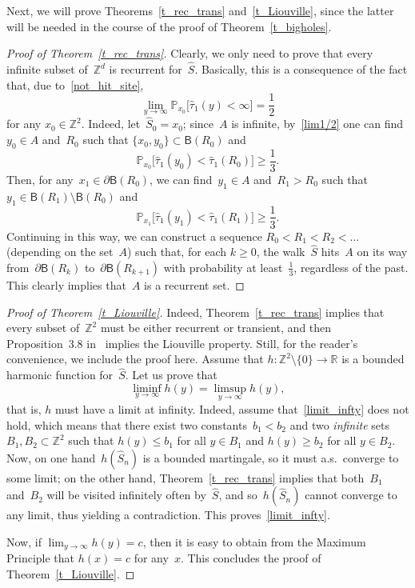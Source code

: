 \documentclass[10pt]{amsart}
\theoremstyle{definition}\newtheorem{defi}[theo]{Definition}\newtheorem{rema}[theo]{Remark}\newtheorem{exam}[theo]{Example}\newtheorem{exem}[theo]{Example}\newtheorem{nota}[theo]{Notation}
\newcommand{\1}[1]{{\mathbf 1}{\{#1\}}}
\newcommand{\Z}{\mathbb{Z}}
\newcommand{\R}{{\mathbb R}}
\newcommand{\s}{{\widehat S}}
\newcommand{\8}{{\infty}}
\newcommand{\IP}{{\mathbb P}}
\newcommand{\htau}{\widehat{\tau}}
\newcommand{\B}{{\mathsf B}}
\begin{document}
Next, we will prove Theorems~\ref{t_rec_trans} and~\ref{t_Liouville}, since the latter will be needed in the course of the proof of Theorem~\ref{t_bigholes}.

\begin{proof}[Proof of Theorem~\ref{t_rec_trans}]
Clearly, we only need to prove that every infinite subset of~$\Z^d$ is recurrent for~$\s$. Basically, this is a consequence of the fact that, due to~\eqref{not_hit_site},
\begin{equation}\label{lim1/2}
\lim_{y\to\infty} \IP_{x_0}\big[\htau_1(y)<\infty\big] = \frac{1}{2}
\end{equation}
for any $x_0\in\Z^2$. Indeed, let~$\s_0=x_0$; since~$A$ is infinite, by~\eqref{lim1/2} one can find~$y_0\in A$ and~$R_0$ such that $\{x_0,y_0\}\subset \B(R_0)$ and
\[
\IP_{x_0}\big[\htau_1(y_0)<\htau_1(R_0)\big] \geq \frac{1}{3}.
\]
Then, for any~$x_1\in \partial\B(R_0)$, we can find~$y_1\in A$ and~$R_1>R_0$ such that $y_1\in \B(R_1)\setminus \B(R_0)$ and
\[
\IP_{x_1}\big[\htau_1(y_1)<\htau_1(R_1)\big] \geq \frac{1}{3}.
\]
Continuing in this way, we can construct a sequence $R_0<R_1<R_2<\ldots$ (depending on the set~$A$) such that, for each $k\geq 0$, the walk~$\s$ hits~$A$ on its way from~$\partial\B(R_k)$ to~$\partial\B(R_{k+1})$ with probability at least~$\frac{1}{3}$, regardless of the past. This clearly implies that~$A$ is a recurrent set.
\end{proof}

\begin{proof}[Proof of Theorem~\ref{t_Liouville}]
Indeed, Theorem~\ref{t_rec_trans} implies that every subset of~$\Z^2$ must be either recurrent or transient, and then Proposition~3.8 in~\cite[Chapter~2]{R84} implies the Liouville property. Still, for the reader's convenience, we include the proof here. Assume that $h:\Z^2\setminus\{0\} \to \R$ is a bounded harmonic function for~$\s$. Let us prove that
\begin{equation}\label{limit_infty}
\liminf_{y\to \infty}h(y) = \limsup_{y\to \infty}h(y),
\end{equation}
that is, $h$ must have a limit at infinity. Indeed, assume that~\eqref{limit_infty} does not hold, which means that there exist two constants~$b_1<b_2$ and two \emph{infinite} sets $B_1,B_2\subset\Z^2$ such that $h(y)\leq b_1$ for all $y\in B_1$ and $h(y) \geq b_2$ for all $y\in B_2$. Now, on one hand~$h(\s_n)$ is a bounded martingale, so it must a.s.\ converge to some limit; on the other hand, Theorem~\ref{t_rec_trans} implies that both~$B_1$ and~$B_2$ will be visited infinitely often by~$\s$, and so~$h(\s_n)$ cannot converge to any limit, thus yielding a contradiction. This proves~\eqref{limit_infty}.

Now, if $\lim_{y\to \infty}h(y)=c$, then it is easy to obtain from the Maximum Principle that $h(x)=c$ for any~$x$. This concludes the proof of Theorem~\ref{t_Liouville}.
\end{proof}
\end{document}
